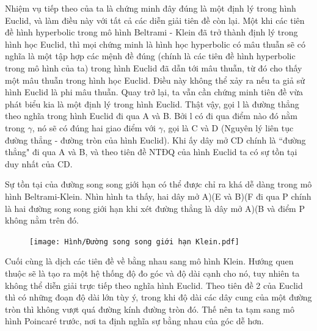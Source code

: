 \begin{multicols}{2}
	Nhiệm vụ tiếp theo của ta là chứng minh đây đúng là một định lý trong hình Euclid, và làm điều này với tất cả các diễn giải tiên đề còn lại. Một khi các tiên đề hình hyperbolic trong mô hình Beltrami - Klein đã trở thành định lý trong hình học Euclid, thì mọi chứng minh là hình học hyperbolic có mâu thuẫn sẽ có nghĩa là một tập hợp các mệnh đề đúng (chính là các tiên đề hình hyperbolic trong mô hình của ta) trong hình Euclid đã dẫn tới mâu thuẫn, từ đó cho thấy một mâu thuẫn trong hình học Euclid. Điều này không thể xảy ra nếu ta giả sử hình Euclid là phi mâu thuẫn.
	Quay trở lại, ta vẫn cần chứng minh tiên đề vừa phát biểu kia là một định lý trong hình Euclid.
	Thật vậy, gọi l là đường thẳng theo nghĩa trong hình Euclid đi qua A và B. Bởi l có đi qua điểm nào đó nằm trong $\gamma$, nó sẽ có đúng hai giao điểm với $\gamma$, gọi là C và D (Nguyên lý liên tục đường thẳng - đường tròn của hình Euclid). Khi ấy dây mở CD chính là ``đường thẳng" đi qua A và B, và theo tiên đề NTĐQ của hình Euclid ta có sự tồn tại duy nhất của CD.
	
	Sự tồn tại của  đường song song giới hạn có thể được chỉ ra khá dễ dàng trong mô hình Beltrami-Klein. Nhìn hình ta thấy, hai dây mở A)(E và B)(F đi qua P chính là hai đường song song giới hạn khi xét đường thẳng là dây mở A)(B và điểm P không nằm trên đó.
	
	\begin{figure}[ht]
		\texttt{[image: Hình/Đường song song giới hạn Klein.pdf]}
	\end{figure}
	
	
	Cuối cùng là dịch các tiên đề về bằng nhau sang mô hình Klein. Hướng quen thuộc sẽ là tạo ra một hệ thống độ đo góc và độ dài cạnh cho nó, tuy nhiên ta không thể diễn giải trực tiếp theo nghĩa hình Euclid. Theo tiên đề 2 của Euclid thì có những đoạn độ dài lớn tùy ý, trong khi độ dài các dây cung của một đường tròn thì không vượt quá đường kính đường tròn đó.
	Thế nên ta tạm sang mô hình Poincaré trước, nơi ta định nghĩa sự bằng nhau của góc dễ hơn.
	

\end{multicols}
